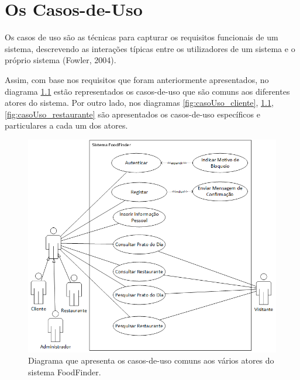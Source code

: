 \documentclass[a4paper,12pt]{report}
\begin{document}
\chapter{Os Casos-de-Uso}	

	Os casos de uso são as técnicas para capturar os requisitos funcionais de um sistema, descrevendo as interações típicas entre os utilizadores de um sistema e o próprio sistema (Fowler, 2004).

	Assim, com base nos requisitos que foram anteriormente apresentados, no diagrama \ref{fig:casoUso_comum} estão representados os casos-de-uso que são comuns aos diferentes atores do sistema. Por outro lado, nos diagramas \ref{fig:casoUso_cliente}, \ref{fig:casoUso_comum}, \ref{fig:casoUso_restaurante} são apresentados os casos-de-uso específicos e particulares a cada um dos atores.
	
	
	\begin{figure}[H]
	\begin{center}
	\includegraphics[scale=0.68]{casoUso_comum}	
	\end{center}
	\medskip
	\caption{Diagrama que apresenta os casos-de-uso comuns aos vários atores do sistema FoodFinder.}
	\label{fig:casoUso_comum}	
	\end{figure}
	
\end{document}
